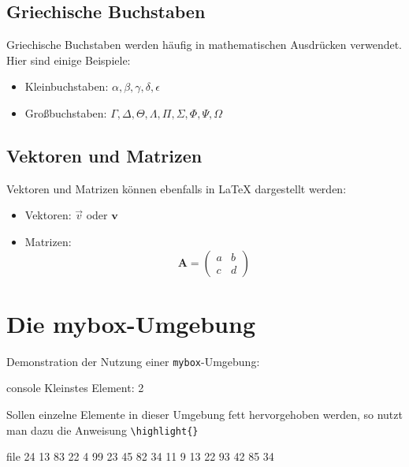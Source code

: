 \subsection*{Griechische Buchstaben}

Griechische Buchstaben werden häufig in mathematischen Ausdrücken verwendet.
Hier sind einige Beispiele:

\begin{itemize}
    \item Kleinbuchstaben: \(\alpha, \beta, \gamma, \delta, \epsilon\)
    \item Großbuchstaben: \(\Gamma, \Delta, \Theta, \Lambda, \Pi, \Sigma, \Phi,
    \Psi, \Omega\)
\end{itemize}

\subsection*{Vektoren und Matrizen}

Vektoren und Matrizen können ebenfalls in \LaTeX{} dargestellt werden:

\begin{itemize}
    \item Vektoren: \(\vec{v}\) oder \(\mathbf{v}\)
    \item Matrizen: 
    \begin{equation}
    \mathbf{A} = \begin{pmatrix}
    a & b \\
    c & d
    \end{pmatrix}
    \end{equation}
\end{itemize}



\section*{Die mybox-Umgebung}

Demonstration der Nutzung einer \texttt{mybox}-Umgebung:

\begin{mybox}[Bildschirmausgabe]{console}
  Kleinstes Element: 2
\end{mybox}

Sollen einzelne Elemente in dieser Umgebung fett hervorgehoben werden, so nutzt
man dazu die Anweisung \texttt{\textbackslash highlight\{\}}

\begin{mybox}{file}
   24 13 83 22 4  99 23 45  82 34 11 9  13 22 93 42 85 34
\end{mybox}


